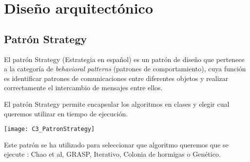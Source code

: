 \section{Diseño arquitectónico}
\subsection{Patrón Strategy}
El patrón Strategy (Estrategia en español) es un patrón de diseño que pertenece a la categoría de \textit{behavioral patterns} (patrones de comportamiento), cuya función es identificar patrones de comunicaciones entre diferentes objetos y realizar correctamente el intercambio de mensajes entre ellos.

El patrón Strategy permite encapsular los algoritmos en clases y elegir cual queremos utilizar en tiempo de ejecución.

\texttt{[image: C3\_PatronStrategy]}

Este patrón se ha utilizado para seleccionar que algoritmo queremos que se ejecute : Chao et al, GRASP, Iterativo, Colonia de hormigas o Genético.

